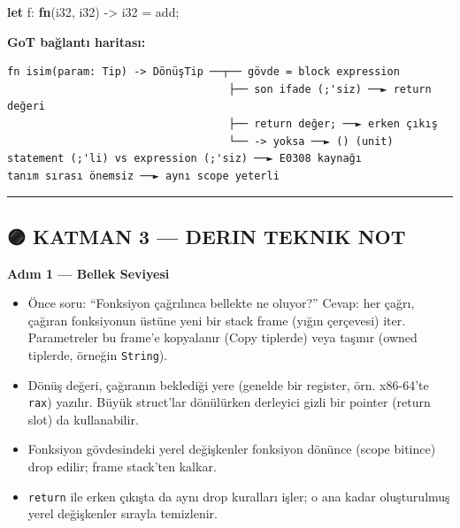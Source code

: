 \documentclass[12pt,a4paper]{article}
\newenvironment{Shaded}{}{}
\newcommand{\DataTypeTok}[1]{\textcolor[rgb]{0.56,0.13,0.00}{#1}}
\newcommand{\KeywordTok}[1]{\textcolor[rgb]{0.00,0.44,0.13}{\textbf{#1}}}
\newcommand{\NormalTok}[1]{#1}
\newcommand{\OperatorTok}[1]{\textcolor[rgb]{0.40,0.40,0.40}{#1}}
\begin{document}
\begin{itemize}
\begin{Shaded}
\begin{Highlighting}[]
\KeywordTok{let}\NormalTok{ f}\OperatorTok{:} \KeywordTok{fn}\OperatorTok{(}\DataTypeTok{i32}\OperatorTok{,} \DataTypeTok{i32}\OperatorTok{)} \OperatorTok{-\textgreater{}} \DataTypeTok{i32} \OperatorTok{=}\NormalTok{ add}\OperatorTok{;}
\end{Highlighting}
\end{Shaded}
\end{itemize}

\textbf{GoT bağlantı haritası:}

\begin{verbatim}
fn isim(param: Tip) -> DönüşTip ──┬── gövde = block expression
                                   ├── son ifade (;'siz) ──► return değeri
                                   ├── return değer; ──► erken çıkış
                                   └── -> yoksa ──► () (unit)
statement (;'li) vs expression (;'siz) ──► E0308 kaynağı
tanım sırası önemsiz ──► aynı scope yeterli
\end{verbatim}

\begin{center}\rule{0.5\linewidth}{0.5pt}\end{center}

\subsection{🟣 KATMAN 3 --- DERIN TEKNIK NOT}\label{katman-3-—-derin-teknik-not-9}

\textbf{Adım 1 --- Bellek Seviyesi}

\begin{itemize}
\tightlist
\item
  Önce soru: ``Fonksiyon çağrılınca bellekte ne oluyor?'' Cevap: her çağrı, çağıran fonksiyonun üstüne yeni bir stack frame (yığın çerçevesi) iter. Parametreler bu frame'e kopyalanır (Copy tiplerde) veya taşınır (owned tiplerde, örneğin \texttt{String}).
\item
  Dönüş değeri, çağıranın beklediği yere (genelde bir register, örn. x86-64'te \texttt{rax}) yazılır. Büyük struct'lar dönülürken derleyici gizli bir pointer (return slot) da kullanabilir.
\item
  Fonksiyon gövdesindeki yerel değişkenler fonksiyon dönünce (scope bitince) drop edilir; frame stack'ten kalkar.
\item
  \texttt{return} ile erken çıkışta da aynı drop kuralları işler; o ana kadar oluşturulmuş yerel değişkenler sırayla temizlenir.
\end{itemize}
\end{document}
